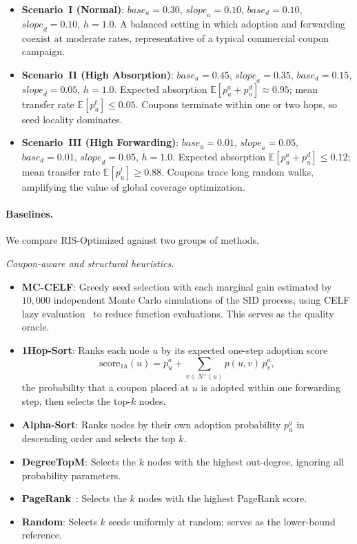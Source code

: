 \documentclass[sigconf]{acmart}
\begin{document}
\begin{itemize}
  \item \textbf{Scenario~I (Normal)}: $\textit{base}_a=0.30$, $\textit{slope}_a=0.10$, $\textit{base}_d=0.10$, $\textit{slope}_d=0.10$, $h=1.0$. A balanced setting in which adoption and forwarding coexist at moderate rates, representative of a typical commercial coupon campaign.

  \item \textbf{Scenario~II (High Absorption)}: $\textit{base}_a=0.45$, $\textit{slope}_a=0.35$, $\textit{base}_d=0.15$, $\textit{slope}_d=0.05$, $h=1.0$. Expected absorption $\mathbb{E}[p_u^a + p_u^d] \approx 0.95$; mean transfer rate $\mathbb{E}[p_u^t] \leq 0.05$. Coupons terminate within one or two hops, so seed locality dominates.

  \item \textbf{Scenario~III (High Forwarding)}: $\textit{base}_a=0.01$, $\textit{slope}_a=0.05$, $\textit{base}_d=0.01$, $\textit{slope}_d=0.05$, $h=1.0$. Expected absorption $\mathbb{E}[p_u^a + p_u^d] \leq 0.12$; mean transfer rate $\mathbb{E}[p_u^t] \geq 0.88$. Coupons trace long random walks, amplifying the value of global coverage optimization.
\end{itemize}

\paragraph{Baselines.}
We compare RIS-Optimized against two groups of methods.

\smallskip\noindent\textit{Coupon-aware and structural heuristics.}
\begin{itemize}
  \item \textbf{MC-CELF}: Greedy seed selection with each marginal gain estimated by $10{,}000$ independent Monte Carlo simulations of the SID process, using CELF lazy evaluation~\cite{leskovec2007celf} to reduce function evaluations. This serves as the quality oracle.
  \item \textbf{1Hop-Sort}: Ranks each node $u$ by its expected one-step adoption score
    \[
      \mathrm{score}_{1h}(u) = p_u^a + \sum_{v \in N^+(u)} p(u,v)\, p_v^a,
    \]
    the probability that a coupon placed at $u$ is adopted within one forwarding step, then selects the top-$k$ nodes.
  \item \textbf{Alpha-Sort}: Ranks nodes by their own adoption probability $p_u^a$ in descending order and selects the top $k$.
  \item \textbf{DegreeTopM}: Selects the $k$ nodes with the highest out-degree, ignoring all probability parameters.
  \item \textbf{PageRank}~\cite{page1999pagerank}: Selects the $k$ nodes with the highest PageRank score.
  \item \textbf{Random}: Selects $k$ seeds uniformly at random; serves as the lower-bound reference.
\end{itemize}
\end{document}
